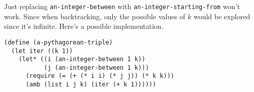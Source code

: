 \documentclass[a4paper,12pt]{article}
\begin{document}
Just replacing \lstinline!an-integer-between! with
\lstinline!an-integer-starting-from! won't work.  Since when
backtracking, only the possible values of $k$ would be explored since
it's infinite.  Here's a possible implementation.

\begin{lstlisting}
(define (a-pythagorean-triple)
  (let iter ((k 1))
    (let* ((i (an-integer-between 1 k))
           (j (an-integer-between 1 k)))
      (require (= (+ (* i i) (* j j)) (* k k)))
      (amb (list i j k) (iter (+ k 1))))))
\end{lstlisting}
\end{document}
